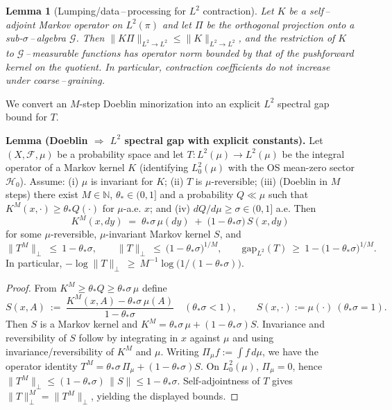 \documentclass[11pt]{amsart}
\theoremstyle{plain}
\newtheorem{lemma}[theorem]{Lemma}
\theoremstyle{definition}
\theoremstyle{remark}
\begin{document}
\begin{lemma}[Lumping/data\,–\,processing for $L^2$ contraction]\label{lem:lumping}
Let $K$ be a self\,–\,adjoint Markov operator on $L^2(\pi)$ and let $\Pi$ be the orthogonal projection onto a sub-$\sigma$\,–\,algebra $\mathcal G$. Then $\| K\Pi\|_{L^2\to L^2} \le \|K\|_{L^2\to L^2}$, and the restriction of $K$ to $\mathcal G$\,–\,measurable functions has operator norm bounded by that of the pushforward kernel on the quotient. In particular, contraction coefficients do not increase under coarse\,–\,graining.
\end{lemma}

\noindent We convert an $M$-step Doeblin minorization into an explicit $L^2$ spectral gap bound for $T$.

\begingroup
\newcommand{\inner}[2]{\left\langle #1,#2\right\rangle}
\newcommand{\norm}[1]{\left\lVert #1\right\rVert}

\noindent\textbf{Lemma (Doeblin $\Rightarrow$ $L^2$ spectral gap with explicit constants).}\label{lem:doeblin-L2-gap}
Let $(X,\mathcal F,\mu)$ be a probability space and let $T:L^2(\mu)\to L^2(\mu)$ be the integral operator of a Markov kernel $K$ (identifying $L^2_0(\mu)$ with the OS mean-zero sector $\mathcal H_0$). Assume: (i) $\mu$ is invariant for $K$; (ii) $T$ is $\mu$-reversible; (iii) (Doeblin in $M$ steps) there exist $M\in\mathbb N$, $\theta_*\in(0,1]$ and a probability $Q\ll\mu$ such that $K^{M}(x,\cdot)\ge \theta_* Q(\cdot)$ for $\mu$-a.e. $x$; and (iv) $dQ/d\mu\ge \sigma\in(0,1]$ a.e. Then
\[
  K^{M}(x,dy)\;=\;\theta_*\sigma\,\mu(dy)\;+\;\bigl(1-\theta_*\sigma\bigr)\,S(x,dy)
\]
for some $\mu$-reversible, $\mu$-invariant Markov kernel $S$, and
\[
  \bigl\|T^{M}\bigr\|_{\perp}\ \le\ 1-\theta_*\sigma,\qquad
  \|T\|_{\perp}\ \le\ \bigl(1-\theta_*\sigma\bigr)^{1/M},\qquad
  \mathrm{gap}_{L^2}(T)\ \ge\ 1-\bigl(1-\theta_*\sigma\bigr)^{1/M}.
\]
In particular, $-\log\|T\|_{\perp}\ \ge\ M^{-1}\log\!\big(1/(1-\theta_*\sigma)\big)$.

\begin{proof}
From $K^{M}\ge \theta_* Q\ge \theta_*\sigma\,\mu$ define
\[
  S(x,A)\ :=\ \frac{K^{M}(x,A)-\theta_*\sigma\,\mu(A)}{1-\theta_*\sigma}\quad(\theta_*\sigma<1),\qquad S(x,\cdot):=\mu(\cdot)\ (\theta_*\sigma=1).
\]
Then $S$ is a Markov kernel and $K^{M}=\theta_*\sigma\,\mu+(1-\theta_*\sigma)S$. Invariance and reversibility of $S$ follow by integrating in $x$ against $\mu$ and using invariance/reversibility of $K^{M}$ and $\mu$. Writing $\Pi_\mu f:=\int f\,d\mu$, we have the operator identity $T^{M}=\theta_*\sigma\,\Pi_\mu+(1-\theta_*\sigma)S$. On $L^2_0(\mu)$, $\Pi_\mu=0$, hence $\|T^{M}\|_{\perp}\le (1-\theta_*\sigma)\,\|S\|\le 1-\theta_*\sigma$. Self-adjointness of $T$ gives $\|T\|_{\perp}^{M}=\|T^{M}\|_{\perp}$, yielding the displayed bounds.
\end{proof}
\endgroup
\end{document}

